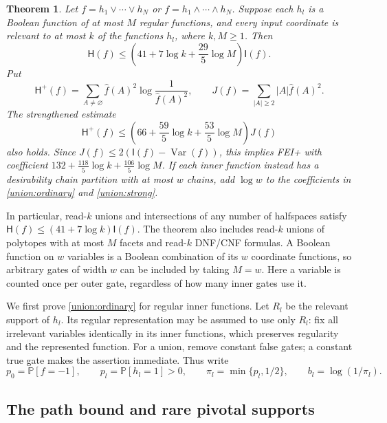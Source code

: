 \documentclass[11pt]{amsart}
\newtheorem{theorem}{Theorem}[section]
\theoremstyle{definition}
\theoremstyle{remark}
\renewcommand{\P}{\mathbb P}
\newcommand{\HH}{\mathsf H}
\newcommand{\I}{\mathsf I}
\DeclareMathOperator{\Var}{Var}
\newcommand{\wh}[1]{\widehat{#1}}
\begin{document}
\begin{theorem}\label{union:theorem}
Let $f=h_1\vee\cdots\vee h_N$ or $f=h_1\wedge\cdots\wedge h_N$.
Suppose each $h_l$ is a Boolean function of at most $M$ regular functions, and every input coordinate is relevant to at most $k$ of the functions $h_l$, where $k,M\ge1$.
Then
\begin{equation}\label{union:ordinary}
 \HH(f)\le\left(41+7\log k+\frac{29}{5}\log M\right)\I(f).
\end{equation}
Put
\[
 \HH^+(f)=\sum_{A\ne\varnothing}\wh f(A)^2\log\frac1{\wh f(A)^2},
 \qquad
 J(f)=\sum_{|A|\ge2}|A|\wh f(A)^2.
\]
The strengthened estimate
\begin{equation}\label{union:strong}
 \HH^+(f)\le\left(66+\frac{59}{5}\log k+\frac{53}{5}\log M\right)J(f)
\end{equation}
also holds. Since $J(f)\le2(\I(f)-\Var(f))$, this implies FEI+ with coefficient
$132+\frac{118}{5}\log k+\frac{106}{5}\log M$.
If each inner function instead has a desirability chain partition with at most $w$ chains, add $\log w$ to the coefficients in \eqref{union:ordinary} and \eqref{union:strong}.
\end{theorem}

In particular, read-$k$ unions and intersections of any number of halfspaces satisfy
$\HH(f)\le(41+7\log k)\I(f)$.
The theorem also includes read-$k$ unions of polytopes with at most $M$ facets and read-$k$ DNF/CNF formulas.
A Boolean function on $w$ variables is a Boolean combination of its $w$ coordinate functions, so arbitrary gates of width $w$ can be included by taking $M=w$.
Here a variable is counted once per outer gate, regardless of how many inner gates use it.

We first prove \eqref{union:ordinary} for regular inner functions.
Let $R_l$ be the relevant support of $h_l$.
Its regular representation may be assumed to use only $R_l$: fix all irrelevant variables identically in its inner functions, which preserves regularity and the represented function.
For a union, remove constant false gates; a constant true gate makes the assertion immediate.
Thus write
\[
 p_0=\P[f=-1],\qquad p_l=\P[h_l=1]>0,\qquad
 \pi_l=\min\{p_l,1/2\},\qquad b_l=\log(1/\pi_l).
\]

\subsection{The path bound and rare pivotal supports}
\end{document}

